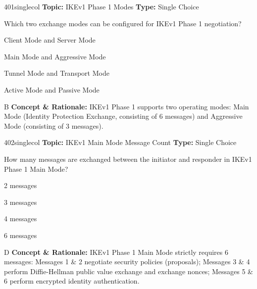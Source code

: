 \begin{qcard}{401}{singlecol}
\textcolor{darkslate!75}{\small\textbf{Topic:} IKEv1 Phase 1 Modes \hfill \textbf{Type:} Single Choice}\vspace{0.4em}\par
Which two exchange modes can be configured for IKEv1 Phase 1 negotiation?
\begin{qoptions}
\item Client Mode and Server Mode
\item Main Mode and Aggressive Mode
\item Tunnel Mode and Transport Mode
\item Active Mode and Passive Mode
\end{qoptions}
\end{qcard}
\nopagebreak
\begin{explainbox}{B}
\textbf{Concept \& Rationale:} IKEv1 Phase 1 supports two operating modes: Main Mode (Identity Protection Exchange, consisting of 6 messages) and Aggressive Mode (consisting of 3 messages).
\end{explainbox}

\begin{qcard}{402}{singlecol}
\textcolor{darkslate!75}{\small\textbf{Topic:} IKEv1 Main Mode Message Count \hfill \textbf{Type:} Single Choice}\vspace{0.4em}\par
How many messages are exchanged between the initiator and responder in IKEv1 Phase 1 Main Mode?
\begin{qoptions}
\item 2 messages
\item 3 messages
\item 4 messages
\item 6 messages
\end{qoptions}
\end{qcard}
\nopagebreak
\begin{explainbox}{D}
\textbf{Concept \& Rationale:} IKEv1 Phase 1 Main Mode strictly requires 6 messages: Messages 1 \& 2 negotiate security policies (proposals); Messages 3 \& 4 perform Diffie-Hellman public value exchange and exchange nonces; Messages 5 \& 6 perform encrypted identity authentication.
\end{explainbox}

